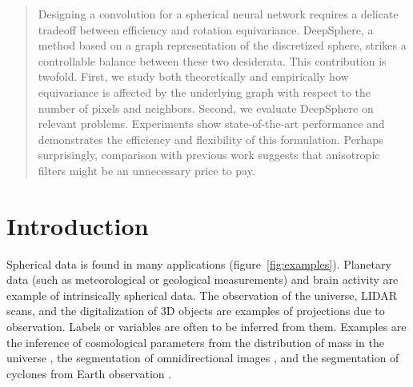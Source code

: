 \documentclass{article} %
\newcommand{\figref}[1]{figure~\ref{fig:#1}}
\begin{document}
\begin{abstract}
Designing a convolution for a spherical neural network requires a delicate tradeoff between efficiency and rotation equivariance.
DeepSphere, a method based on a graph representation of the discretized sphere, strikes a controllable balance between these two desiderata.
This contribution is twofold.
First, we study both theoretically and empirically how equivariance is affected by the underlying graph with respect to the number of pixels and neighbors.
Second, we evaluate DeepSphere on relevant problems.
Experiments show state-of-the-art performance and demonstrates the efficiency and flexibility of this formulation.
Perhaps surprisingly, comparison with previous work suggests that anisotropic filters might be an unnecessary price to pay.
\end{abstract}

\section{Introduction}

Spherical data is found in many applications (\figref{examples}).
Planetary data (such as meteorological or geological measurements) and brain activity are example of intrinsically spherical data.
The observation of the universe, LIDAR scans, and the digitalization of 3D objects are examples of projections due to observation.
Labels or variables are often to be inferred from them.
Examples are the inference of cosmological parameters from the distribution of mass in the universe \citep{perraudin2019deepspherecosmo}, the segmentation of omnidirectional images \citep{khasanova2017sphericalcnn}, and the segmentation of cyclones from Earth observation \citep{mudigonda2017climateevents}.
\end{document}
